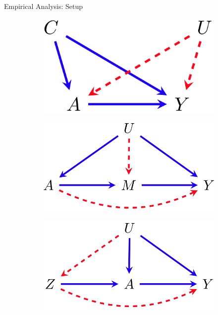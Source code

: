 \documentclass{beamer}
\begin{document}
\begin{frame}{Empirical Analysis: Setup}
	\begin{figure}
		\begin{subfigure}{0.33 \textwidth}
			\center
			\includegraphics[scale=0.15]{m1.png}
		\end{subfigure}%
		\begin{subfigure}{0.33 \textwidth}
			\center
			\includegraphics[scale=0.15]{m2.png}
		\end{subfigure}%
		\begin{subfigure}{0.33 \textwidth}
			\center
			\includegraphics[scale=0.15]{m3.png}
		\end{subfigure}
	\end{figure}


\end{frame}
\end{document}

